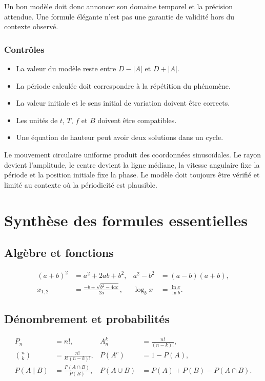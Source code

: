 \documentclass[12pt,a4paper,openany]{book}
\newcommand{\abs}[1]{\left\lvert #1\right\rvert}
\begin{document}
Un bon modèle doit donc annoncer son domaine temporel et la précision attendue. Une formule élégante n'est pas une garantie de validité hors du contexte observé.

\subsection{Contrôles}

\begin{itemize}
\item La valeur du modèle reste entre $D-\abs A$ et $D+\abs A$.
\item La période calculée doit correspondre à la répétition du phénomène.
\item La valeur initiale et le sens initial de variation doivent être corrects.
\item Les unités de $t$, $T$, $f$ et $B$ doivent être compatibles.
\item Une équation de hauteur peut avoir deux solutions dans un cycle.
\end{itemize}

\begin{summarybox}
Le mouvement circulaire uniforme produit des coordonnées sinusoïdales. Le rayon devient l'amplitude, le centre devient la ligne médiane, la vitesse angulaire fixe la période et la position initiale fixe la phase. Le modèle doit toujours être vérifié et limité au contexte où la périodicité est plausible.
\end{summarybox}



\backmatter
\chapter*{Synthèse des formules essentielles}

\section*{Algèbre et fonctions}
\begin{align*}
(a+b)^2&=a^2+2ab+b^2,
&a^2-b^2&=(a-b)(a+b),\\
x_{1,2}&=\frac{-b\pm\sqrt{b^2-4ac}}{2a},
&\log_bx&=\frac{\ln x}{\ln b}.
\end{align*}

\section*{Dénombrement et probabilités}
\begin{align*}
P_n&=n!,&
A_n^k&=\frac{n!}{(n-k)!},\\
\binom nk&=\frac{n!}{k!(n-k)!},&
P(A^c)&=1-P(A),\\
P(A\mid B)&=\frac{P(A\cap B)}{P(B)},&
P(A\cup B)&=P(A)+P(B)-P(A\cap B).
\end{align*}
\end{document}
